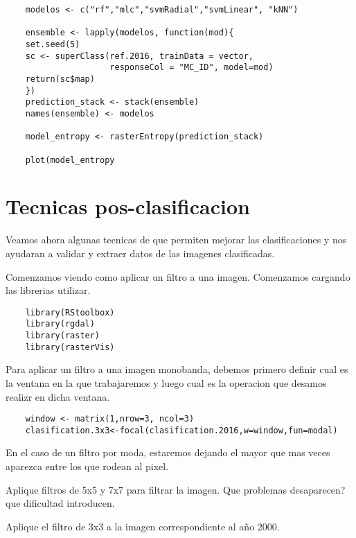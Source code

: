 \documentclass[a4paper]{article}
\begin{document}
\begin{lstlisting}
    modelos <- c("rf","mlc","svmRadial","svmLinear", "kNN")
      
    ensemble <- lapply(modelos, function(mod){
    set.seed(5)
    sc <- superClass(ref.2016, trainData = vector,
                     responseCol = "MC_ID", model=mod)
    return(sc$map)
    })
    prediction_stack <- stack(ensemble)
    names(ensemble) <- modelos
    
    model_entropy <- rasterEntropy(prediction_stack)

    plot(model_entropy
\end{lstlisting}

\section{Tecnicas pos-clasificacion}

Veamos ahora algunas tecnicas de que permiten mejorar las clasificaciones y nos
ayudaran a validar y extraer datos de las imagenes clasificadas.

Comenzamos viendo como aplicar un filtro a una imagen. Comenzamos cargando las
librerias utilizar.

\begin{lstlisting}
    library(RStoolbox)
    library(rgdal)
    library(raster)
    library(rasterVis)
\end{lstlisting}

Para aplicar un filtro a una imagen monobanda, debemos primero definir cual es
la ventana en la que trabajaremos y luego cual es la operacion que desamos
realizr en dicha ventana.

\begin{lstlisting}
    window <- matrix(1,nrow=3, ncol=3)
    clasification.3x3<-focal(clasification.2016,w=window,fun=modal)
\end{lstlisting}

En el caso de un filtro por moda, estaremos dejando el mayor que mas veces
aparezca entre los que rodean al pixel.

\begin{act}
    Aplique filtros de 5x5 y 7x7 para filtrar la imagen. Que problemas
    desaparecen? que dificultad introducen.
\end{act}

\begin{act}
    Aplique el filtro de 3x3 a la imagen correspondiente al año 2000.
\end{act}
\end{document}
